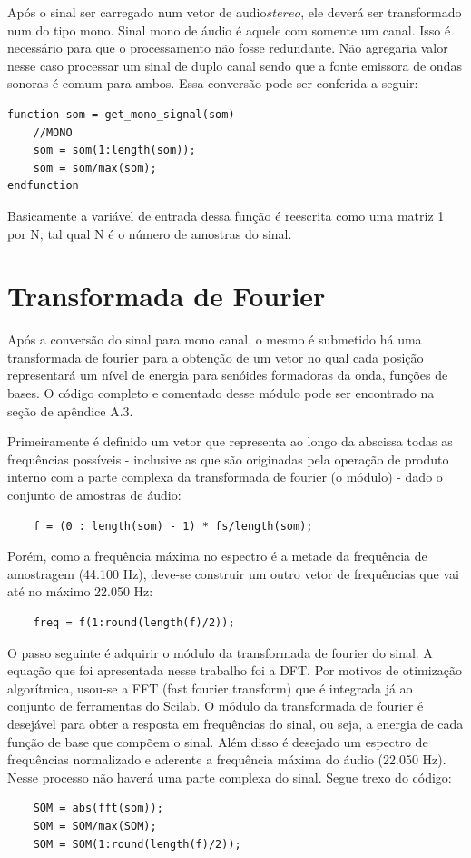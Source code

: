 Após o sinal ser carregado num vetor de audio$stereo$, ele deverá ser transformado num do tipo mono. Sinal mono de áudio é aquele com somente um canal. Isso é necessário para que o processamento não fosse redundante. Não agregaria valor nesse caso processar um sinal de duplo canal sendo que a fonte emissora de ondas sonoras é comum para ambos. Essa conversão pode ser conferida a seguir:
\begin{lstlisting}
function som = get_mono_signal(som)
	//MONO
	som = som(1:length(som));
	som = som/max(som);
endfunction
\end{lstlisting}

Basicamente a variável de entrada dessa função é reescrita como uma matriz 1 por N, tal qual N é o número de amostras do sinal.

\section{Transformada de Fourier}
\label{sec:transformada}

Após a conversão do sinal para mono canal, o mesmo é submetido há uma transformada de fourier para a obtenção de um vetor no qual cada posição representará um nível de energia para senóides formadoras da onda, funções de bases. O código completo e comentado desse módulo pode ser encontrado na seção de apêndice A.3.

Primeiramente é definido um vetor que representa ao longo da abscissa todas as frequências possíveis - inclusive as que são originadas pela operação de produto interno com a parte complexa da transformada de fourier (o módulo) - dado o conjunto de amostras de áudio:
\begin{lstlisting}
	f = (0 : length(som) - 1) * fs/length(som);
\end{lstlisting}

Porém, como a frequência máxima no espectro é a metade da frequência de amostragem (44.100 Hz), deve-se construir um outro vetor de frequências que vai até no máximo 22.050 Hz:
\begin{lstlisting}
	freq = f(1:round(length(f)/2));
\end{lstlisting}

O passo seguinte é adquirir o módulo da transformada de fourier do sinal. A equação que foi apresentada nesse trabalho foi a DFT. Por motivos de otimização algorítmica, usou-se a FFT (fast fourier transform) que é integrada já ao conjunto de ferramentas do Scilab. O módulo da transformada de fourier é desejável para obter a resposta em frequências do sinal, ou seja, a energia de cada função de base que compõem o sinal. Além disso é desejado um espectro de frequências normalizado e aderente a frequência máxima do áudio (22.050 Hz). Nesse processo não haverá uma parte complexa do sinal. Segue trexo do código:
\begin{lstlisting}
	SOM = abs(fft(som));
	SOM = SOM/max(SOM);
	SOM = SOM(1:round(length(f)/2));
\end{lstlisting}


